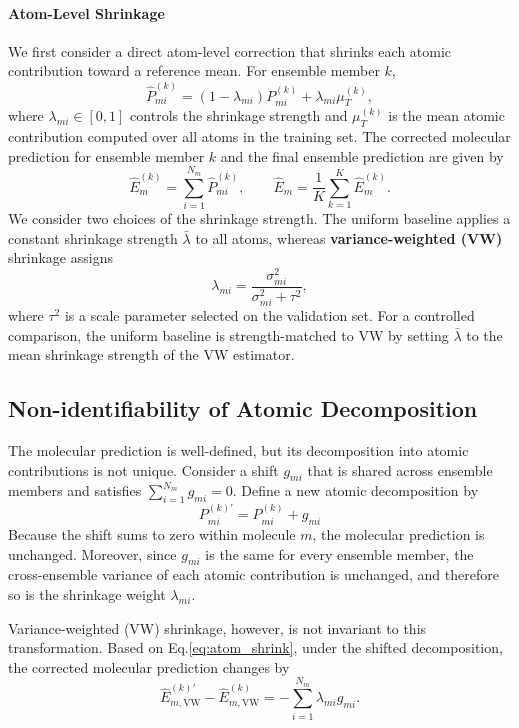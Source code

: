 \documentclass{article}
\begin{document}
\paragraph{Atom-Level Shrinkage}
We first consider a direct atom-level correction that shrinks each atomic contribution toward a reference mean. For ensemble member $k$,
\begin{equation}\label{eq:atom_shrink}
    \hat{P}_{mi}^{(k)}
=(1-\lambda_{mi})P_{mi}^{(k)}+\lambda_{mi}\mu_T^{(k)},
\end{equation}
where $\lambda_{mi}\in[0,1]$ controls the shrinkage strength and $\mu_T^{(k)}$ is the mean atomic contribution computed over all atoms in the training set. The corrected molecular prediction for ensemble member $k$ and the final ensemble prediction are given by
$$
\hat{E}_{m}^{(k)}=\sum_{i=1}^{N_m}\hat{P}_{mi}^{(k)},\qquad\hat{E}_{m}=\frac{1}{K}\sum_{k=1}^{K}\hat{E}_{m}^{(k)}.
$$
We consider two choices of the shrinkage strength. The uniform baseline applies a constant shrinkage strength $\bar{\lambda}$ to all atoms, whereas\textbf{ variance-weighted (VW)} shrinkage assigns
$$
\lambda_{mi}
=
\frac{\sigma_{mi}^2}{\sigma_{mi}^2+\tau^2},
$$
where $\tau^2$ is a scale parameter selected on the validation set.
For a controlled comparison, the uniform baseline is strength-matched to VW by setting
$\bar{\lambda}$ to the mean shrinkage strength of the VW estimator.


\subsection{Non-identifiability of Atomic Decomposition}
The molecular prediction is well-defined, but its decomposition into atomic contributions is not unique. Consider a shift $g_{mi}$ that is shared across ensemble members and satisfies
$
\sum_{i =1}^{N_m} g_{mi} = 0
$. Define a new atomic decomposition by
\begin{equation}\label{eq:add_Gauge}
    P_{mi}^{(k)\prime} = P_{mi}^{(k)} + g_{mi}
\end{equation}
Because the shift sums to zero within molecule $m$, the molecular prediction is unchanged. Moreover, since $g_{mi}$ is the same for every ensemble member, the cross-ensemble variance of each atomic contribution is unchanged, and therefore so is the shrinkage weight $\lambda_{mi}$.

Variance-weighted (VW) shrinkage, however, is not invariant to this transformation. Based on Eq.\ref{eq:atom_shrink}, under the shifted decomposition, the corrected molecular prediction changes by
$$
\hat{E}_{m,\mathrm{VW}}^{(k)\prime}
-
\hat{E}_{m,\mathrm{VW}}^{(k)}
=
-
\sum_{i=1}^{N_m} \lambda_{mi} g_{mi}.
$$
\end{document}
